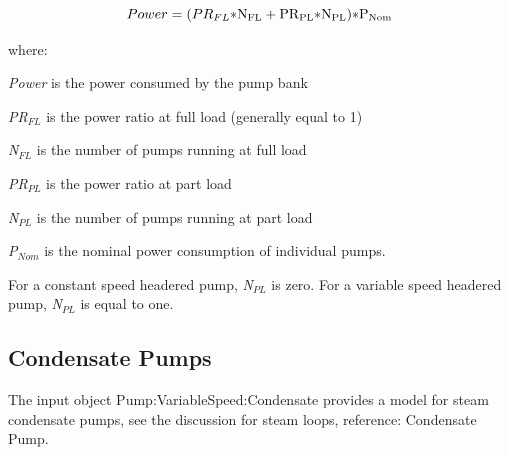 \begin{equation}
Power = (P{R_{FL}}{\rm{*N}}{}_{{\rm{FL}}} + {\rm{P}}{{\rm{R}}_{{\rm{PL}}}}{\rm{*}}{{\rm{N}}_{{\rm{PL}}}}{\rm{)*}}{{\rm{P}}_{{\rm{Nom}}}}{\rm{  }}
\end{equation}

where:

\emph{Power} is the power consumed by the pump bank

\emph{PR\(_{FL}\)} is the power ratio at full load (generally equal to 1)

\emph{N\(_{FL}\)} is the number of pumps running at full load

\emph{PR\(_{PL}\)} is the power ratio at part load

\emph{N\(_{PL}\)} is the number of pumps running at part load

\emph{P\(_{Nom}\)} is the nominal power consumption of individual pumps.

For a constant speed headered pump, \emph{N\(_{PL}\)} is zero. For a variable speed headered pump, \emph{N\(_{PL}\)} is equal to one.

\subsection{Condensate Pumps}\label{condensate-pumps}

The input object Pump:VariableSpeed:Condensate provides a model for steam condensate pumps, see the discussion for steam loops, reference: Condensate Pump.
